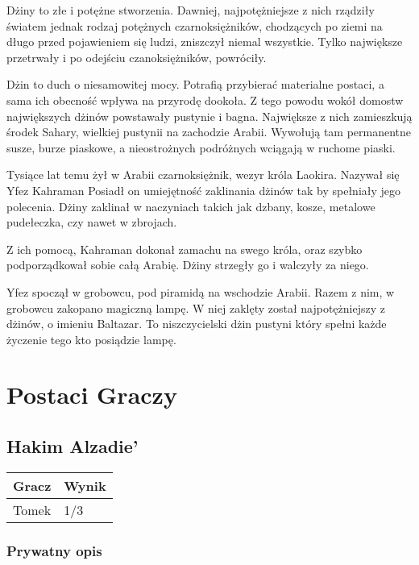 \documentclass[11pt]{article}
\begin{document}
  Dżiny to złe i potężne stworzenia. Dawniej, najpotężniejsze z nich
  rządziły światem jednak rodzaj potężnych czarnoksiężników, chodzących
  po ziemi na długo przed pojawieniem się ludzi, zniszczył niemal
  wszystkie. Tylko największe przetrwały i po odejściu
  czanoksiężników, powróciły.

  Dżin to duch o niesamowitej mocy. Potrafią przybierać materialne
  postaci, a sama ich obecność wpływa na przyrodę dookoła. Z tego
  powodu wokół domostw największych dżinów powstawały pustynie i
  bagna. Największe z nich zamieszkują środek Sahary, wielkiej
  pustynii na zachodzie Arabii. Wywołują tam permanentne susze,
  burze piaskowe, a nieostrożnych podróżnych wciągają w ruchome
  piaski.

  Tysiące lat temu żył w Arabii czarnoksiężnik, wezyr króla
  Laokira. Nazywał się Yfez Kahraman Posiadł on umiejętność
  zaklinania dżinów tak by spełniały 
  jego polecenia. Dżiny zaklinał w naczyniach takich jak dzbany,
  kosze, metalowe pudełeczka, czy nawet w zbrojach. 

  Z ich pomocą, Kahraman dokonał zamachu na swego króla, oraz szybko
  podporządkował sobie całą Arabię. Dżiny strzegły go i walczyły za
  niego.

  Yfez spoczął w grobowcu, pod piramidą na wschodzie Arabii. Razem z
  nim, w grobowcu zakopano magiczną lampę. W niej zaklęty został
  najpotężniejszy z dżinów, o imieniu Baltazar. To niszczycielski
  dżin pustyni który spełni każde życzenie tego kto posiądzie lampę.

\section*{Postaci Graczy}
\label{sec-3}

\subsection*{Hakim Alzadie'}
\label{sec-3.1}


\begin{center}
\begin{tabular}{ll}
 Gracz  &  Wynik  \\
\hline
 Tomek  &  1/3    \\
\end{tabular}
\end{center}


\subsubsection*{Prywatny opis}
\label{sec-3.1.1}
\end{document}
